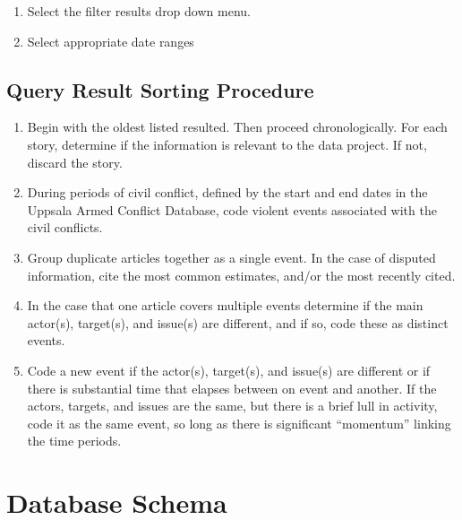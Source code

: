 \documentclass[letterpaper,10pt,english]{sphinxmanual}
\begin{document}
\begin{enumerate}
\begin{itemize}
\begin{enumerate}
\begin{itemize}
\end{itemize}

\item {} 
\sphinxAtStartPar
Select the filter results drop down menu.

\item {} 
\sphinxAtStartPar
Select appropriate date ranges

\end{enumerate}


\section{Query Result Sorting Procedure}
\label{\detokenize{event_query_procedure:query-result-sorting-procedure}}\begin{enumerate}
%
\item {} 
\sphinxAtStartPar
Begin with the oldest listed resulted.  Then proceed chronologically.  For each story, determine if the information is relevant to the data project.  If not, discard the story.

\item {} 
\sphinxAtStartPar
During periods of civil conflict, defined by the start and end dates in the Uppsala Armed Conflict Database, code violent events associated with the civil conflicts.

\item {} 
\sphinxAtStartPar
Group duplicate articles together as a single event.  In the case of disputed information, cite the most common estimates, and/or the most recently cited.

\item {} 
\sphinxAtStartPar
In the case that one article covers multiple events determine if the main actor(s), target(s), and issue(s) are different, and if so, code these as distinct events.

\item {} 
\sphinxAtStartPar
Code a new event if the actor(s), target(s), and issue(s) are different or if there is substantial time that elapses between on event and another.  If the actors, targets, and issues are the same, but there is a brief lull in activity, code it as the same event, so long as there is significant “momentum” linking the time periods.

\end{enumerate}


\chapter{Database Schema}
\label{\detokenize{schema_tables:database-schema}}\label{\detokenize{schema_tables:coding-procedure}}\label{\detokenize{schema_tables::doc}}
\begin{sphinxShadowBox}


\end{sphinxShadowBox}
\end{itemize}
\end{enumerate}
\end{document}
